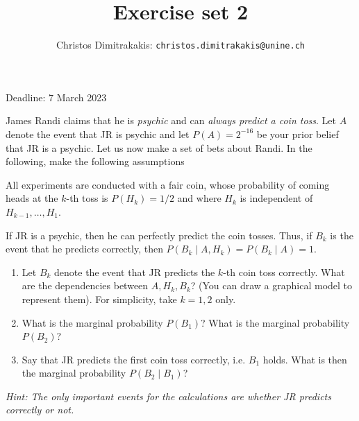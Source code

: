 \documentclass[twoside,a4paper]{article}
\begin{document}
\title{Exercise set 2}

\author{Christos Dimitrakakis: \texttt{christos.dimitrakakis@unine.ch}}

\maketitle
\large{Deadline: 7 March 2023}


\vspace{1em}

\begin{exercise}
  James Randi claims that he is \emph{psychic} and can \emph{always predict a coin toss}. Let $A$ denote the event that JR is psychic and let $P(A) = 2^{-16}$ be your prior belief that JR is a psychic. Let us now make a set of bets about Randi.
  In the following, make the following assumptions
  \begin{assumption}
    All experiments are conducted with a fair coin, whose probability of coming heads at the $k$-th toss is $P(H_k) = 1/2$ and where $H_k$ is independent of $H_{k-1}, \ldots, H_1$.
  \end{assumption}
  \begin{assumption}
    If JR is a psychic, then he can perfectly predict the coin tosses. Thus, if $B_k$ is the event that he predicts correctly, then $P(B_k \mid A, H_k) = P(B_k \mid A) = 1$.
  \end{assumption}


  
  \begin{enumerate}
  \item Let $B_k$ denote the event that JR predicts the $k$-th coin toss correctly. What are the dependencies between $A, H_k, B_k$? (You can draw a graphical model to represent them). For simplicity, take $k=1, 2$ only.
  \item What is the marginal probability $P(B_1)$? What is the marginal probability $P(B_2)$?  
  \item Say that JR predicts the first coin toss correctly, i.e. $B_1$ holds. What is then the marginal probability $P(B_2 \mid B_1)$? 
  \end{enumerate}
  \emph{Hint: The only important events for the calculations are whether JR predicts correctly or not.}
\end{exercise}
\end{document}
